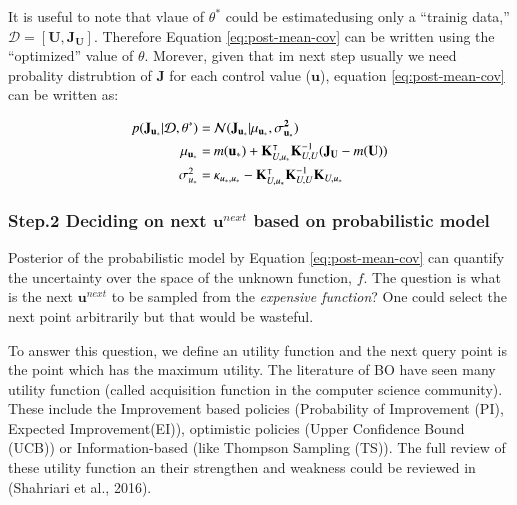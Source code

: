 \documentclass[]{elsarticle} %
\begin{document}
It is useful to note that vlaue of \(\theta^{\ast}\) could be estimatedusing only a ``trainig data,''\(\mathcal{D}=[\mathbf{U},\mathbf{J_U}]\). Therefore Equation \eqref{eq:post-mean-cov} can be written using the ``optimized'' value of \(\theta\). Morever, given that im next step usually we need probality distrubtion of \(\mathbf{J}\) for each control value (\(\mathbf{u}\)), equation \eqref{eq:post-mean-cov} can be written as:

\begin{align}
  \begin{split}
p(\mathbf{J_{u_*}}|\mathbf{\mathcal{D},\theta^\ast})= & \:  \mathcal{N}(\mathbf{J_{u_*}}| \mathbf{\mu_{u_\ast}}, \mathbf{\sigma^2_{u_{\ast}}}) \\
\mathbf{\mu_{u_\ast}}= & \:  m(\mathbf{u_\ast}) +\mathbf{K}^\intercal_{U,u_*} \mathbf{K}^{-1}_{U,U}(\mathbf{J_U}-m(\mathbf{U})) \\
\textstyle \sigma^2_{u_{\ast}}=& \:  \normalsize{\mathbf{\kappa}_{u_\ast,u_\ast}-\mathbf{K}^\intercal_{U,u_\ast}\mathbf{K}_{U,U}^{-1}\mathbf{K}_{U,u_\ast}}
  \end{split}
\label{eq:post-mean-cov-single}
\end{align}

\hypertarget{step.2-deciding-on-next-mathbfunext-based-on-probabilistic-model}{%
\subsubsection{\texorpdfstring{Step.2 Deciding on next \(\mathbf{u}^{next}\) based on probabilistic model}{Step.2 Deciding on next \textbackslash mathbf\{u\}\^{}\{next\} based on probabilistic model}}\label{step.2-deciding-on-next-mathbfunext-based-on-probabilistic-model}}

Posterior of the probabilistic model by Equation \eqref{eq:post-mean-cov} can quantify the uncertainty over the space of the unknown function, \(f\). The question is what is the next \(\mathbf{u}^{next}\) to be sampled from the \emph{expensive function}? One could select the next point arbitrarily but that would be wasteful.

To answer this question, we define an utility function and the next query point is the point which has the maximum utility. The literature of BO have seen many utility function (called acquisition function in the computer science community). These include the Improvement based policies (Probability of Improvement (PI), Expected Improvement(EI)), optimistic policies (Upper Confidence Bound (UCB)) or Information-based (like Thompson Sampling (TS)). The full review of these utility function an their strengthen and weakness could be reviewed in (Shahriari et al., 2016).
\end{document}
